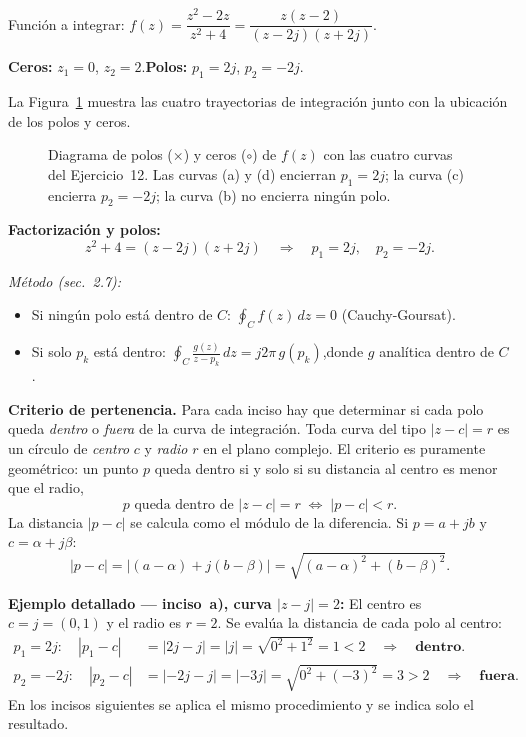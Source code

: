 \documentclass[10pt,a4paper]{article}
\begin{document}
\noindent Función a integrar: $f(z)=\dfrac{z^2-2z}{z^2+4}=\dfrac{z(z-2)}{(z-2j)(z+2j)}$.

\noindent\textbf{Ceros:} $z_1=0$, $z_2=2$.\quad \textbf{Polos:} $p_1=2j$, $p_2=-2j$.

La Figura~\ref{fig:pz_ej12} muestra las cuatro trayectorias de integración junto con la ubicación de los polos y ceros.

\begin{figure}[H]
	\centering
	
	\caption{Diagrama de polos ($\times$) y ceros ($\circ$) de $f(z)$ con las cuatro curvas del Ejercicio~12. Las curvas (a) y (d) encierran $p_1=2j$; la curva (c) encierra $p_2=-2j$; la curva (b) no encierra ningún polo.}
	\label{fig:pz_ej12}
\end{figure}

\noindent\textbf{Factorización y polos:}
\[
	z^2+4 = (z-2j)(z+2j) \quad\Rightarrow\quad p_1 = 2j,\quad p_2 = -2j.
\]

\noindent\textit{Método (sec.~2.7):}
\begin{itemize}[nosep]
	\item Si ningún polo está dentro de $C$: $\oint_C f(z)\,dz = 0$ (Cauchy-Goursat).
	\item Si solo $p_k$ está dentro: $\displaystyle\oint_C \frac{g(z)}{z-p_k}\,dz = j2\pi\,g(p_k)$,\quad donde $g$ analítica dentro de $C$.
\end{itemize}

\bigskip

\noindent\textbf{Criterio de pertenencia.}
Para cada inciso hay que determinar si cada polo queda \emph{dentro} o \emph{fuera} de la curva de integración.
Toda curva del tipo $|z-c|=r$ es un círculo de \emph{centro} $c$ y \emph{radio} $r$ en el plano complejo.
El criterio es puramente geométrico: un punto $p$ queda dentro si y solo si su distancia al centro es menor que el radio,
\[
	p \text{ queda dentro de }|z-c|=r
	\;\iff\;
	|p - c| < r.
\]
La distancia $|p-c|$ se calcula como el módulo de la diferencia. Si $p=a+jb$ y $c=\alpha+j\beta$:
\[
	|p - c| = |(a-\alpha)+j(b-\beta)| = \sqrt{(a-\alpha)^2+(b-\beta)^2}.
\]

\noindent\textbf{Ejemplo detallado — inciso~a), curva $|z-j|=2$:}
El centro es $c=j=(0,1)$ y el radio es $r=2$.
Se evalúa la distancia de cada polo al centro:
\begin{align*}
	p_1 = 2j: \quad |p_1 - c| &= |2j - j| = |j| = \sqrt{0^2+1^2} = 1 < 2 \quad\Rightarrow\quad \textbf{dentro.} \\[4pt]
	p_2 = {-2j}: \quad |p_2 - c| &= |-2j - j| = |-3j| = \sqrt{0^2+(-3)^2} = 3 > 2 \quad\Rightarrow\quad \textbf{fuera.}
\end{align*}
En los incisos siguientes se aplica el mismo procedimiento y se indica solo el resultado.
\end{document}
